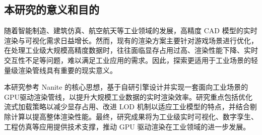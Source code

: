 \subsection{本研究的意义和目的}

随着智能制造、建筑仿真、航空航天等工业领域的发展，高精度 CAD 模型的实时渲染与可视化需求日益增长。然而，现有的渲染方案主要针对游戏场景进行优化，在处理工业级大规模高精度数据时，往往面临显存占用过高、渲染性能下降、实时交互性不足等问题，难以满足工业应用的需求。因此，探索更适用于工业场景的轻量级渲染管线具有重要的现实意义。

本研究参考 Nanite 的核心思想，基于自研引擎设计并实现一套面向工业场景的 GPU驱动渲染管线，以提升大规模工业数据的实时渲染效率。研究重点包括优化流式加载策略以减少显存占用、改进 LOD 机制以适应工业模型的特点，并结合剔除计算以提高整体渲染性能。最终，研究成果将为工业级实时可视化、数字孪生、工程仿真等应用提供技术支撑，推动 GPU 驱动渲染在工业领域的进一步发展。